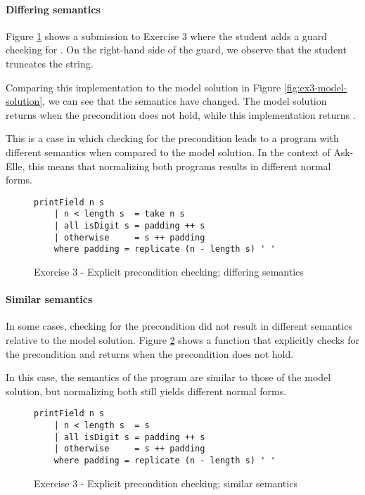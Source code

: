 \paragraph{Differing semantics}

Figure \ref{fig:analysis-precondition-example} shows a submission to Exercise 3 where the student adds a guard checking for . On the right-hand side of the guard, we observe that the student truncates the string.

Comparing this implementation to the model solution in Figure \ref{fig:ex3-model-solution}, we can see that the semantics have changed. The model solution returns  when the precondition does not hold, while this implementation returns .

This is a case in which checking for the precondition leads to a program with different semantics when compared to the model solution. In the context of Ask-Elle, this means that normalizing both programs  results in different normal forms.

\begin{figure}
\centering
\begin{verbatim}
printField n s
    | n < length s  = take n s
    | all isDigit s = padding ++ s
    | otherwise     = s ++ padding
    where padding = replicate (n - length s) ' '
\end{verbatim}
\caption{Exercise 3 - Explicit precondition checking; differing semantics}
\label{fig:analysis-precondition-example}
\end{figure}

\paragraph{Similar semantics}

In some cases, checking for the precondition did not result in different semantics relative to the model solution. Figure \ref{fig:analysis-precondition-similar-semantics} shows a function that explicitly checks for the precondition and returns  when the precondition does not hold.

In this case, the semantics of the program are similar to those of the model solution, but normalizing both still yields different normal forms.

\begin{figure}
\centering
\begin{verbatim}
printField n s
    | n < length s  = s
    | all isDigit s = padding ++ s
    | otherwise     = s ++ padding
    where padding = replicate (n - length s) ' '
\end{verbatim}
\caption{Exercise 3 - Explicit precondition checking; similar semantics}
\label{fig:analysis-precondition-similar-semantics}
\end{figure}

